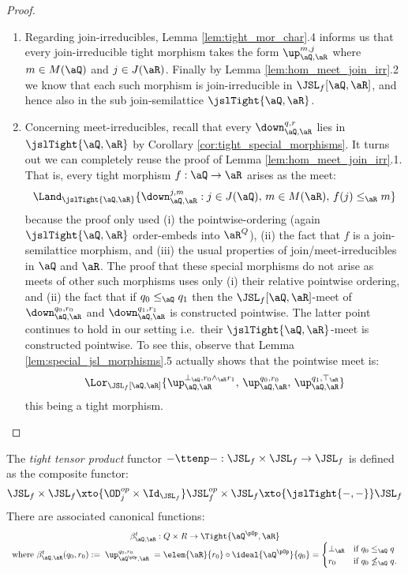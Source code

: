 \documentclass{article}
\begin{document}
\begin{proof}
\item
\begin{enumerate}
\item
Regarding join-irreducibles, Lemma \ref{lem:tight_mor_char}.4 informs us that every join-irreducible tight morphism takes the form $\up_{\aQ,\aR}^{m,j}$ where $m \in M(\aQ)$ and $j \in J(\aR)$. Finally by Lemma \ref{lem:hom_meet_join_irr}.2 we know that each such morphism is join-irreducible in $\JSL_f[\aQ,\aR]$, and hence also in the sub join-semilattice $\jslTight{\aQ,\aR}$.


\item
Concerning meet-irreducibles, recall that every $\down_{\aQ,\aR}^{q,r}$ lies in $\jslTight{\aQ,\aR}$ by Corollary \ref{cor:tight_special_morphisms}. It turns out we can completely reuse the proof of Lemma \ref{lem:hom_meet_join_irr}.1. That is, every tight morphism $f : \aQ \to \aR$ arises as the meet:
\[
\Land_{\jslTight{\aQ,\aR}} \{ \down_{\aQ,\aR}^{j,m} : j \in J(\aQ), \, m \in M(\aR), \, f(j) \leq_\aR m \}
\]
because the proof only used (i) the pointwise-ordering (again $\jslTight{\aQ,\aR}$ order-embeds into $\aR^Q$), (ii) the fact that $f$ is a join-semilattice morphism, and (iii) the usual properties of join/meet-irreducibles in $\aQ$ and $\aR$. The proof that these special morphisms do not arise as meets of other such morphisms uses only (i) their relative pointwise ordering, and (ii) the fact that if $q_0 \leq_\aQ q_1$ then the $\JSL_f[\aQ,\aR]$-meet of $\down_{\aQ,\aR}^{q_0,r_0}$ and $\down_{\aQ,\aR}^{q_1,r_1}$ is constructed pointwise. The latter point continues to hold in our setting i.e.\ their $\jslTight{\aQ,\aR}$-meet is constructed pointwise. To see this, observe that Lemma \ref{lem:special_jsl_morphisms}.5 actually shows that the pointwise meet is:
\[
\Lor_{\JSL_f[\aQ,\aR]} \{ \up_{\aQ,\aR}^{\bot_\aQ,r_0 \land_\aR r_1}, \, \up_{\aQ,\aR}^{q_0,r_0}, \, \up_{\aQ,\aR}^{q_1,\top_\aR} \}
\]
this being a tight morphism.
\end{enumerate}
\end{proof}


\begin{definition}
\label{def:ttenp}
\item
The \emph{tight tensor product} functor $- \ttenp - : \JSL_f \times \JSL_f \to \JSL_f$ is defined as the composite functor:
\[
\JSL_f \times \JSL_f \xto{\OD_j^{op} \times \Id_{\JSL_f}} \JSL_f^{op} \times \JSL_f \xto{\jslTight{-,-}} \JSL_f
\]
There are associated canonical functions:
\[
\begin{tabular}{c}
$\beta_{\aQ,\aR}^t : Q \times R \to \Tight{\aQ^{\pOp},\aR}$
\\
where $\beta_{\aQ,\aR}^t(q_0,r_0) := \; \up_{\aQ^{\pOp},\aR}^{q_0,r_0} \; = \elem{\aR}{r_0} \circ \ideal{\aQ^{\pOp}}{q_0} = 
\begin{cases}
\bot_\aR & \text{if $q_0 \leq_\aQ q$}
\\
r_0 & \text{if $q_0 \nleq_\aQ q$}.
\end{cases}$
\end{tabular}
\]
\endbox
\end{definition}
\end{document}
